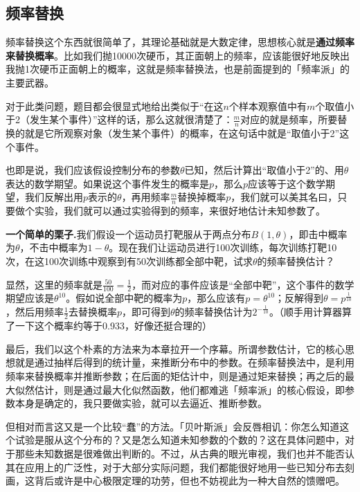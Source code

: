 \documentclass[10pt, a4paper]{article}
\begin{document}
\subsection{频率替换}
频率替换这个东西就很简单了，其理论基础就是大数定律，思想核心就是\textbf{通过频率来替换概率}。比如我们抛10000次硬币，其正面朝上的频率，应该能很好地反映出我抛1次硬币正面朝上的概率，这就是频率替换法，也是前面提到的「频率派」的主要武器。\par
对于此类问题，题目都会很显式地给出类似于“在这$n$个样本观察值中有$m$个取值小于2（发生某个事件）”这样的话，那么这就很清楚了：$\frac{m}{n}$对应的就是频率，所要替换的就是它所观察对象（发生某个事件）的概率，在这句话中就是“取值小于2”这个事件。\par
也即是说，我们应该假设控制分布的参数$\theta$已知，然后计算出“取值小于2”的、用$\theta$表达的数学期望。如果说这个事件发生的概率是$p$，那么$p$应该等于这个数学期望，我们反解出用$p$表示的$\theta$，再用频率$\frac{m}{n}$替换掉概率$p$，我们就可以美其名曰，只要做个实验，我们就可以通过实验得到的频率，来很好地估计未知参数了。\\\par

\textbf{一个简单的栗子.}我们假设一个运动员打靶服从于两点分布$B(1,\theta)$，即击中概率为$\theta$，不击中概率为$1-\theta$。现在我们让运动员进行100次训练，每次训练打靶10次，在这100次训练中观察到有50次训练都全部中靶，试求$\theta$的频率替换估计？\par
显然，这里的频率就是$\frac{50}{100}=\frac{1}{2}$，而对应的事件应该是“全部中靶”，这个事件的数学期望应该是$\theta^{10}$。假如说全部中靶的概率为$p$，那么应该有$p=\theta^{10}$；反解得到$\theta = p^{\frac{1}{10}}$，然后用频率$\frac{1}{2}$去替换概率$p$，即可得到$\theta$的频率替换估计为$2^{-\frac{1}{10}}$。（顺手用计算器算了一下这个概率约等于0.933，好像还挺合理的）\\\par

最后，我们以这个朴素的方法来为本章拉开一个序幕。所谓参数估计，它的核心思想就是通过抽样后得到的统计量，来推断分布中的参数。在频率替换法中，是利用频率来替换概率并推断参数；在后面的矩估计中，则是通过矩来替换；再之后的最大似然估计，则是通过最大化似然函数，他们都难逃「频率派」的核心假设，即参数本身是确定的，我只要做实验，就可以去逼近、推断参数。\par
但相对而言这又是一个比较“蠢”的方法。「贝叶斯派」会反唇相讥：你怎么知道这个试验是服从这个分布的？又是怎么知道未知参数的个数的？这在具体问题中，对于那些未知数据是很难做出判断的。不过，从古典的眼光审视，我们也并不能否认其在应用上的广泛性，对于大部分实际问题，我们都能很好地用一些已知分布去刻画，这背后或许是中心极限定理的功劳，但也不妨视此为一种大自然的馈赠吧。
\end{document}
